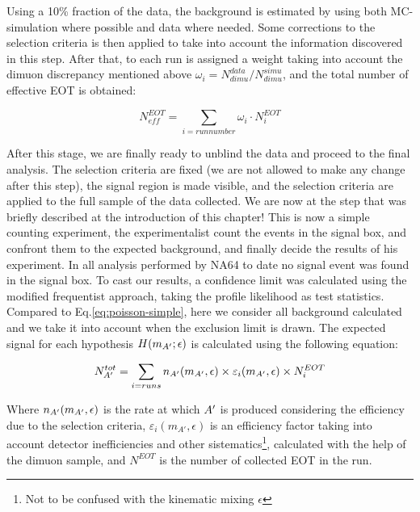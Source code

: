 Using a 10\% fraction of the data, the background is estimated by using both MC-simulation where possible and data where needed. Some corrections to the selection criteria is then applied to take into account the information discovered in this step. After that, to each run is assigned a weight taking into account the dimuon discrepancy mentioned above $\omega_i = N^{data}_{dimu}/N^{simu}_{dimu}$, and the total number of effective EOT is obtained:

\begin{equation}
  \label{eq:effective-eots}
  N_{eff}^{EOT} = \sum_{i=run number} \omega_i \cdot N^{EOT}_i
\end{equation}

After this stage, we are finally ready to unblind the data and proceed to the final analysis. The selection criteria are fixed (we are not allowed to make any change after this step), the signal region is made visible, and the selection criteria are applied to the full sample of the data collected. We are now at the step that was briefly described at the introduction of this chapter! This is now a simple counting experiment, the experimentalist count the events in the signal box, and confront them to the expected background, and finally decide the results of his experiment. In all analysis performed by NA64 to date \cite{Banerjee:2020fue,Banerjee:2019hmi,NA64:2019imj,na64-prd,Banerjee:2018vgk,Banerjee:2016tad} no signal event was found in the signal box. To cast our results, a confidence limit was calculated using the modified frequentist approach, taking the profile likelihood as test statistics\cite{JUNK1999435,Read_2002,Cowan:2010js}. Compared to Eq.\ref{eq:poisson-simple}, here we consider all background calculated and we take it into account when the exclusion limit is drawn. The expected signal for each hypothesis $H(m_{A'};\epsilon)$ is calculated using the following equation:

\begin{equation}
  \label{eq:dm-expected-signal}
  N^{tot}_{A'} = \sum_{i=runs} n_{A'}(m_{A'},\epsilon) \times \varepsilon_i(m_{A'},\epsilon) \times N^{EOT}_i
\end{equation}

Where $n_{A'}(m_{A'},\epsilon)$ is the rate at which $A'$ is produced considering the efficiency due to the selection criteria, $\varepsilon_i(m_{A'},\epsilon)$ is an efficiency factor taking into account detector inefficiencies and other sistematics\footnote{Not to be confused with the kinematic mixing $\epsilon$}, calculated with the help of the dimuon sample, and $N^{EOT}$ is the number of collected EOT in the run.

